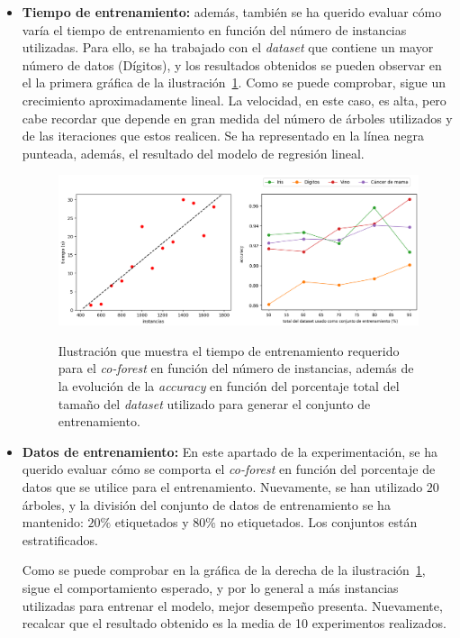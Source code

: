 \begin{itemize}
	\item \textbf{Tiempo de entrenamiento:} además, también se ha querido evaluar cómo varía el tiempo de entrenamiento en función del número de instancias utilizadas. Para ello, se ha trabajado con el \textit{dataset} que contiene un mayor número de datos (Dígitos), y los resultados obtenidos se pueden observar en el la primera gráfica de la ilustración~\ref{cf:cf_time-percentage}. Como se puede comprobar, sigue un crecimiento aproximadamente lineal. La velocidad, en este caso, es alta, pero cabe recordar que depende en gran medida del número de árboles utilizados y de las iteraciones que estos realicen. Se ha representado en la línea negra punteada, además, el resultado del modelo de regresión lineal.

\begin{figure}[h]
	\caption[\textit{Co-Forest}: resultados (tiempo-porcentaje)]{Ilustración que muestra el tiempo de entrenamiento requerido para el \textit{co-forest} en función del número de instancias, además de la evolución de la \textit{accuracy} en función del porcentaje total del tamaño del \textit{dataset} utilizado para generar el conjunto de entrenamiento.}
	\centering
	\includegraphics[scale=0.4]{../img/memoria/5_coforest_time-percentage}
	\label{cf:cf_time-percentage}
\end{figure}


	\item \textbf{Datos de entrenamiento:} En este apartado de la experimentación, se ha querido evaluar cómo se comporta el \textit{co-forest} en función del porcentaje de datos que se utilice para el entrenamiento. Nuevamente, se han utilizado  $20$ árboles, y la división del conjunto de datos de entrenamiento se ha mantenido: $20\%$ etiquetados y $80\%$ no etiquetados. Los conjuntos están estratificados.
	
	Como se puede comprobar en la gráfica de la derecha de la ilustración~\ref{cf:cf_time-percentage}, sigue el comportamiento esperado, y por lo general a más instancias utilizadas para entrenar el modelo, mejor desempeño presenta. Nuevamente, recalcar que el resultado obtenido es la media de 10 experimentos realizados.
	

\end{itemize}
